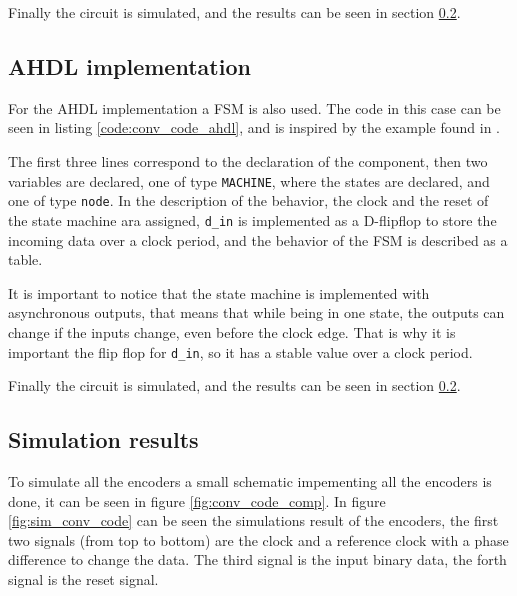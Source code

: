 \documentclass[12pt]{article}   	%
\begin{document}
Finally the circuit is simulated, and the results can be seen in section \ref{sec:conv_code_results}.



\subsection{AHDL implementation}
For the AHDL implementation a FSM is also used. The code in this case can be seen in listing \ref{code:conv_code_ahdl}, and is inspired by the example found in \cite{ahdl}.

The first three lines correspond to the declaration of the component, then two variables are declared, one of type \lstinline|MACHINE|, where the states are declared, and one of type \lstinline|node|. In the description of the behavior, the clock and the reset of the state machine ara assigned, \lstinline|d_in| is implemented as a D-flipflop to store the incoming data over a clock period, and the behavior of the FSM is described as a table.

It is important to notice that the state machine is implemented with asynchronous outputs, that means that while being in one state, the outputs can change if the inputs change, even before the clock edge. That is why it is important the flip flop for \lstinline|d_in|, so it has a stable value over a clock period.

Finally the circuit is simulated, and the results can be seen in section \ref{sec:conv_code_results}.


\subsection{Simulation results}
\label{sec:conv_code_results}

To simulate all the encoders a small schematic impementing all the encoders is done, it can be seen in figure \ref{fig:conv_code_comp}. In figure \ref{fig:sim_conv_code} can be seen the simulations result of the encoders, the first two signals (from top to bottom) are the clock and a reference clock with a phase difference to change the data. The third signal is the input binary data, the forth signal is the reset signal.
\end{document}
